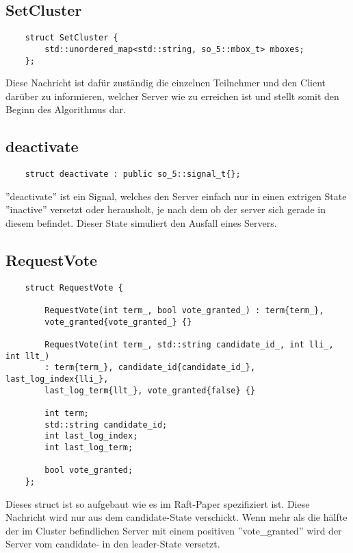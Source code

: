 \subsection{SetCluster}
\begin{verbatim}
    struct SetCluster {
        std::unordered_map<std::string, so_5::mbox_t> mboxes;
    };
\end{verbatim}
Diese Nachricht ist dafür zuständig die einzelnen Teilnehmer und den Client darüber zu informieren, welcher
Server wie zu erreichen ist und stellt somit den Beginn des Algorithmus dar.

\subsection{deactivate}
\begin{verbatim}
    struct deactivate : public so_5::signal_t{};
\end{verbatim}
''deactivate'' ist ein Signal, welches den Server einfach nur in einen extrigen State ''inactive'' versetzt oder herausholt,
je nach dem ob der server sich gerade in diesem befindet. Dieser State simuliert den Ausfall eines Servers.

\subsection{RequestVote}
\begin{verbatim}
    struct RequestVote {

        RequestVote(int term_, bool vote_granted_) : term{term_},
        vote_granted{vote_granted_} {}

        RequestVote(int term_, std::string candidate_id_, int lli_, int llt_)
        : term{term_}, candidate_id{candidate_id_}, last_log_index{lli_},
        last_log_term{llt_}, vote_granted{false} {}

        int term;
        std::string candidate_id;
        int last_log_index;
        int last_log_term;

        bool vote_granted;
    };
\end{verbatim}
Dieses struct ist so aufgebaut wie es im Raft-Paper spezifiziert ist. Diese Nachricht wird nur aus dem
candidate-State verschickt. Wenn mehr als die hälfte der im Cluster befindlichen Server mit einem positiven ''vote\_granted''
wird der Server vom candidate- in den leader-State versetzt.

